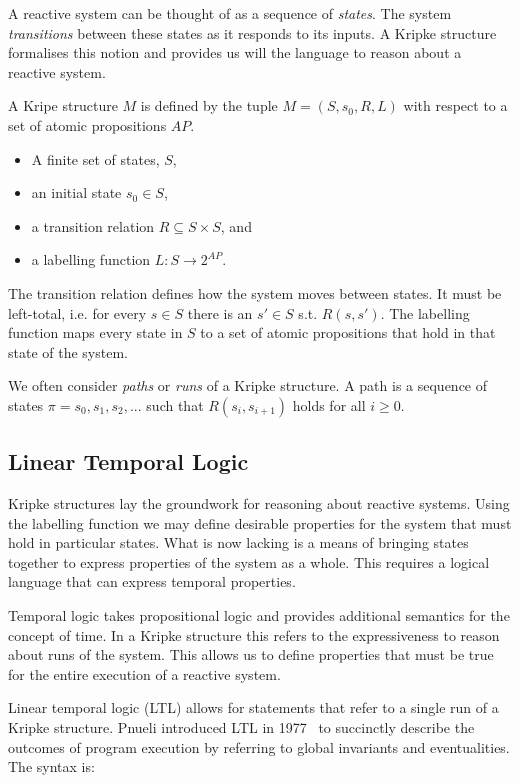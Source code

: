 A reactive system can be thought of as a sequence of \emph{states}. The system
\emph{transitions} between these states as it responds to its inputs. A Kripke
structure~\cite{Kripke63} formalises this notion and provides us will the
language to reason about a reactive system.

A Kripe structure $M$ is defined by the tuple $M = (S, s_0, R, L)$ with respect
to a set of atomic propositions $AP$.

\begin{itemize}
    \item A finite set of states, $S$,
    \item an initial state $s_0 \in S$,
    \item a transition relation $R \subseteq S \times S$, and
    \item a labelling function $L : S \to 2^{AP}$.
\end{itemize}

The transition relation defines how the system moves between states. It must be
left-total, i.e. for every $s \in S$ there is an $s' \in S$ s.t. $R(s, s')$.
The labelling function maps every state in $S$ to a set of atomic propositions
that hold in that state of the system.

We often consider \emph{paths} or \emph{runs} of a Kripke structure. A path is
a sequence of states $\pi = s_0, s_1, s_2, ...$ such that $R(s_i, s_{i+1})$
holds for all $i \geq 0$.

\subsection{Linear Temporal Logic}

Kripke structures lay the groundwork for reasoning about reactive systems. Using the labelling function we may define desirable properties for the system that must hold in particular states. What is now lacking is a means of bringing states together to express properties of the system as a whole. This requires a logical language that can express temporal properties.

Temporal logic takes propositional logic and provides additional semantics for
the concept of time. In a Kripke structure this refers to the expressiveness to
reason about runs of the system. This allows us to define properties that must
be true for the entire execution of a reactive system.

Linear temporal logic (LTL) allows for statements that refer to a single run of
a Kripke structure. Pnueli introduced LTL in 1977~\cite{Pnueli77} to succinctly
describe the outcomes of program execution by referring to global invariants
and eventualities. The syntax is:

